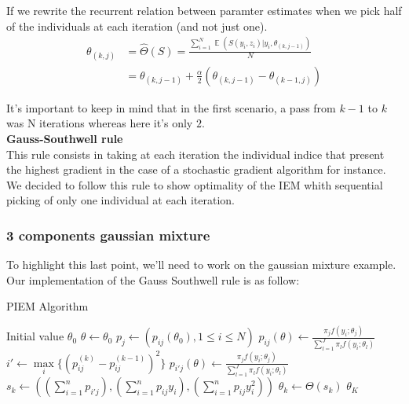 \documentclass[a4paper]{article}
\theoremstyle{plain}
\DeclareMathOperator*{\E}{\mathbb{E}}
\theoremstyle{plain}
\theoremstyle{definition}
\begin{document}
If we rewrite the recurrent relation between paramter estimates when we pick half of the individuals at each iteration (and not just one).
\begin{equation}
\begin{split}
\theta_{(k,j)} &  = \hat{\Theta}(S) = \frac{\sum_{i=1}^{N}{\E{(S(y_i,z_i)|y_i,\theta_{(k,j-1)})}}}{N}\\
& =  \theta_{(k,j-1)} + \frac{\alpha}{2}(\theta_{(k,j-1)} - \theta_{(k-1,j)}) 
\end{split}
\end{equation}

It's important to keep in mind that in the first scenario, a pass from $k-1$ to $k$ was N iterations whereas here it's only $2$.\\
\textbf{Gauss-Southwell rule}\\
This rule consists in taking at each iteration the individual indice that present the highest gradient in the case of a stochastic gradient algorithm for instance.\\
We decided to follow this rule to show optimality of the IEM whith sequential picking of only one individual at each iteration. 
\subsubsection{3 components gaussian mixture}
To highlight this last point, we'll need to work on the gaussian mixture example.\\
Our implementation of the Gauss Southwell rule is as follow:


\begin{algorithm}
    \caption{PIEM Algorithm}
    \label{alg:pseudoPIEM}
    \begin{algorithmic}[1]
    \State Initial value $\theta_0$
    \State $\theta \gets \theta_0$
    \State $p_{j} \gets (p_{ij}(\theta_0),1\leqslant i \leqslant N)$
        \State $p_{ij}(\theta) \gets \frac{\pi_jf(y_i;\theta_j)}{\sum_{l=1}^{J}\pi_lf(y_i;\theta_l)}$
        \EndFor  
        \State $i' \gets \max\limits_{i}\{(p^{(k)}_{ij}-p^{(k-1)}_{ij})^2\}$
        \State $p_{i'j}(\theta) \gets \frac{\pi_jf(y_i;\theta_j)}{\sum_{l=1}^{J}\pi_lf(y_i;\theta_l)}$
        \State $s_k \gets ((\sum_{i=1}^{n}{p_{i'j}}),(\sum_{i=1}^{n}{p_{ij}y_i}),(\sum_{i=1}^{n}{p_{ij}y_i^2}))$
        \State $\theta_k \gets \Theta(s_k)$
    \EndFor  
    \State \Return $\theta_K$
    \end{algorithmic}
\end{algorithm}
\end{document}
